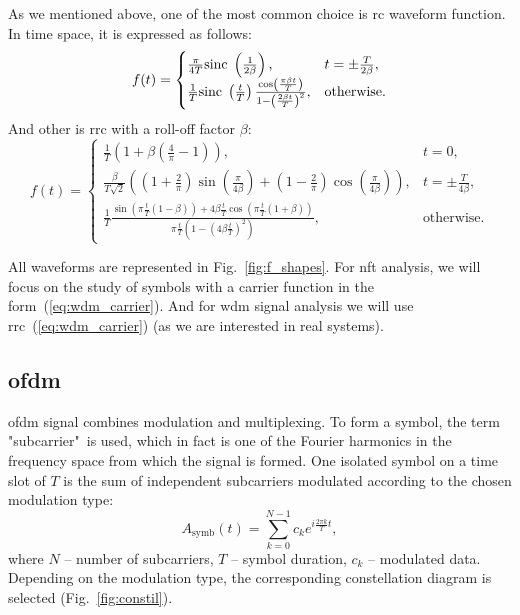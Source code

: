 As we mentioned above, one of the most common choice is \Gls{rc} waveform function. In time space, it is expressed as follows:
\begin{equation}
    f(t) = 
\begin{cases} 
\frac{\pi}{4T} \mathrm{sinc}\; \left( \frac{1}{2\beta} \right), & t = \pm \frac{T}{2\beta}, \\
\frac{1}{T} \mathrm{sinc}\; \left( \frac{t}{T} \right) \frac{\cos\left( \frac{\pi \beta t}{T} \right)}{1 - \left( \frac{2\beta t}{T} \right)^2}, & \text{otherwise}.
\end{cases}
\label{eq:rc_time}
\end{equation}
And other is \Gls{rrc} with a roll-off factor $\beta$:
\begin{equation}
    f(t) = \begin{cases}
    \frac{1}{T}\left( 1 + \beta \left( \frac{4}{\pi} - 1 \right) \right),& t = 0, \\
    \frac{\beta}{T \sqrt{2}} \left( \left( 1 + \frac{2}{\pi} \right) \sin\left( \frac{\pi}{4\beta} \right) + \left( 1 - \frac{2}{\pi} \right) \cos \left( \frac{\pi}{4\beta} \right) \right),& t = \pm \frac{T}{4 \beta},\\
    \frac{1}{T} \frac{\sin \left( \pi \frac{t}{T} \left( 1 - \beta \right) \right) + 4 \beta \frac{t}{T} \cos \left( \pi \frac{t}{T} \left( 1 + \beta \right) \right)}{\pi \frac{t}{T} \left( 1 - \left( 4\beta \frac{t}{T} \right)^2 \right)},&\text{otherwise}.
    \end{cases}
\label{eq:rrc_time}
\end{equation}

All waveforms are represented in Fig.~\ref{fig:f_shapes}.
For \Gls{nft} analysis, we will focus on the study of symbols with a carrier function in the form~(\ref{eq:wdm_carrier}). And for \gls{wdm} signal analysis we will use \gls{rrc}~(\ref{eq:wdm_carrier}) (as we are interested in real systems).




\subsection{\acrlong{ofdm}}
\label{sec:ofdm}

\gls{ofdm} signal combines modulation and multiplexing. To form a symbol, the term "subcarrier"\ is used, which in fact is one of the Fourier harmonics in the frequency space from which the signal is formed. One isolated symbol on a time slot of $ T $ is the sum of independent subcarriers modulated according to the chosen modulation type:
\begin{equation}
    A_{\text{symb}}(t) = \sum_{k=0}^{N-1} c_k e^{i \frac{2 \pi k}{T} t} {,}
    \label{eq:ofdm_symbol}
\end{equation}
where $N$ -- number of subcarriers,
$T$ -- symbol duration,
$c_k$ -- modulated data. 
Depending on the modulation type, the corresponding constellation diagram is selected (Fig.~\ref{fig:constil}).


